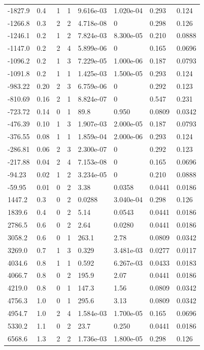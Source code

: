 \documentclass[preview]{standalone}
\begin{document}
{{\begin{tabular}{L{1.2cm}C{1.2cm} C{0.3cm}C{0.5cm} C{1.4cm}C{1.4cm} C{1.4cm}C{1.4cm}}
  -1827.9  &   0.4  & 1     &  1 &  9.616e-03  & 1.020e-04  & 0.293 &  0.124   \\ 
  -1266.8  &   0.3  & 2     &  2 &  4.718e-08  & 0  & 0.298 &  0.126   \\ 
  -1246.1  &   0.2  & 1     &  2 &  7.824e-03  & 8.300e-05  & 0.210 &  0.0888   \\ 
  -1147.0  &   0.2  & 2     &  4 &  5.899e-06  & 0  & 0.165 &  0.0696   \\ 
  -1096.2  &   0.2  & 1     &  3 &  7.229e-05  & 1.000e-06  & 0.187 &  0.0793   \\ 
  -1091.8  &   0.2  & 1     &  1 &  1.425e-03  & 1.500e-05  & 0.293 &  0.124   \\ 
  -983.22  &  0.20  & 2     &  3 &  6.759e-06  & 0  & 0.292 &  0.123   \\ 
  -810.69  &  0.16  & 2     &  1 &  8.824e-07  & 0  & 0.547 &  0.231   \\ 
  -723.72  &  0.14  & 0     &  1 &  89.8  & 0.950  & 0.0809 &  0.0342   \\ 
  -476.39  &  0.10  & 1     &  3 &  1.907e-03  & 2.000e-05  & 0.187 &  0.0793   \\ 
  -376.55  &  0.08  & 1     &  1 &  1.859e-04  & 2.000e-06  & 0.293 &  0.124   \\ 
  -286.81  &  0.06  & 2     &  3 &  2.300e-07  & 0  & 0.292 &  0.123   \\ 
  -217.88  &  0.04  & 2     &  4 &  7.153e-08  & 0  & 0.165 &  0.0696   \\ 
  -94.23  &  0.02  & 1     &  2 &  3.234e-05  & 0  & 0.210 &  0.0888   \\ 
  -59.95  &  0.01  & 0     &  2 &  3.38  & 0.0358  & 0.0441 &  0.0186   \\ 
  1447.2  &   0.3  & 0     &  2 &  0.0288  & 3.040e-04  & 0.298 &  0.126   \\ 
  1839.6  &   0.4  & 0     &  2 &  5.14  & 0.0543  & 0.0441 &  0.0186   \\ 
  2786.5  &   0.6  & 0     &  2 &  2.64  & 0.0280  & 0.0441 &  0.0186   \\ 
  3058.2  &   0.6  & 0     &  1 &  263.1  & 2.78  & 0.0809 &  0.0342   \\ 
  3269.0  &   0.7  & 1     &  3 &  0.329  & 3.481e-03  & 0.0277 &  0.0117   \\ 
  4034.6  &   0.8  & 1     &  1 &  0.592  & 6.267e-03  & 0.0433 &  0.0183   \\ 
  4066.7  &   0.8  & 0     &  2 &  195.9  & 2.07  & 0.0441 &  0.0186   \\ 
  4219.0  &   0.8  & 0     &  1 &  147.3  & 1.56  & 0.0809 &  0.0342   \\ 
  4756.3  &   1.0  & 0     &  1 &  295.6  & 3.13  & 0.0809 &  0.0342   \\ 
  4954.7  &   1.0  & 2     &  4 &  1.584e-03  & 1.700e-05  & 0.165 &  0.0696   \\ 
  5330.2  &   1.1  & 0     &  2 &  23.7  & 0.250  & 0.0441 &  0.0186   \\ 
  6568.6  &   1.3  & 2     &  2 &  1.736e-03  & 1.800e-05  & 0.298 &  0.126   \\ 
\hline 
\end{tabular} 

}}
\end{document}
